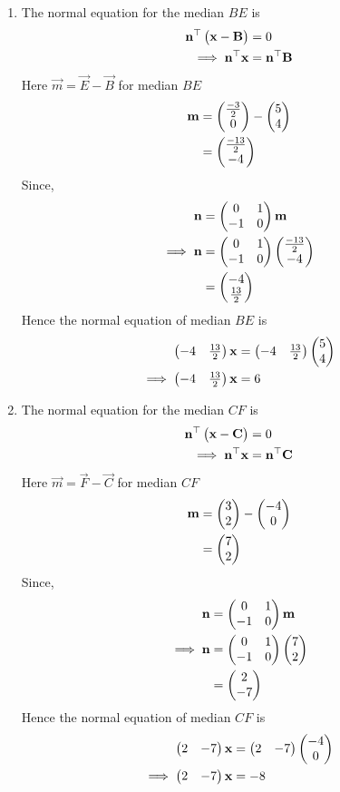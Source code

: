 \documentclass[11pt]{book}
\begin{document}
\begin{enumerate}[label=\thesection.\arabic*.,ref=\thesection.\theenumi]
\begin{enumerate}
\item The normal equation for the median $BE$ is
\begin{align}
\mathbf{n}^{\top}\begin{pmatrix}\mathbf{x}-\mathbf{B}\end{pmatrix}&=0\\
\implies
\mathbf{n}^{\top}\mathbf{x}&=\mathbf{n}^{\top}\mathbf{B}
\end{align}
Here $\vec{m} = \vec{E}- \vec{B}$ for median $BE$
\begin{align}
\mathbf{m}&=\begin{pmatrix}\frac{-3}{2}\\0\end{pmatrix} - \begin{pmatrix}5\\4\end{pmatrix}\\
       &=\begin{pmatrix}\frac{-13}{2}\\-4\end{pmatrix}
\end{align}
Since,
\begin{align}
  \mathbf{n} &= \begin{pmatrix}0 & 1\\
  -1 & 0\end{pmatrix}\mathbf{m}\\
\implies
\mathbf{n} &= \begin{pmatrix}0 & 1\\
  -1 & 0\end{pmatrix}\begin{pmatrix}\frac{-13}{2}\\-4\end{pmatrix}\\
        &= \begin{pmatrix}-4\\ \frac{13}{2}\end{pmatrix}
\end{align}
Hence the normal equation of median $BE$ is 
\begin{align}
    \begin{pmatrix}-4 & \frac{13}{2}\end{pmatrix}\mathbf{x}&=\begin{pmatrix}-4 & \frac{13}{2}\end{pmatrix}\begin{pmatrix}5\\4\end{pmatrix}\\
\implies
    \begin{pmatrix}-4 & \frac{13}{2}\end{pmatrix}\mathbf{x}&={6}
\end{align}

\item The normal equation for the median $CF$ is
\begin{align}
\mathbf{n}^{\top}\begin{pmatrix}\mathbf{x}-\mathbf{C}\end{pmatrix}&=0\\
\implies
\mathbf{n}^{\top}\mathbf{x}&=\mathbf{n}^{\top}\mathbf{C}
\end{align}
Here $\vec{m} = \vec{F}- \vec{C}$ for median $CF$
\begin{align}
\mathbf{m}&=\begin{pmatrix}3\\2\end{pmatrix} - \begin{pmatrix}-4\\0\end{pmatrix}\\
       &=\begin{pmatrix}7\\2\end{pmatrix}
\end{align}
Since,
\begin{align}
  \mathbf{n} &= \begin{pmatrix}0 & 1\\
  -1 & 0\end{pmatrix}\mathbf{m}\\
\implies
\mathbf{n} &= \begin{pmatrix}0 & 1\\
  -1 & 0\end{pmatrix}\begin{pmatrix}7 \\ 2 \end{pmatrix}\\
        &= \begin{pmatrix}2 \\ -7\end{pmatrix}
\end{align}
Hence the normal equation of median $CF$ is 
\begin{align}
    \begin{pmatrix}2 & -7 \end{pmatrix}\mathbf{x}&=\begin{pmatrix}2 & -7\end{pmatrix}\begin{pmatrix}-4\\0\end{pmatrix}\\
\implies
    \begin{pmatrix}2 & -7\end{pmatrix}\mathbf{x}&=-8
\end{align}
\end{enumerate}


\end{enumerate}
\end{document}
